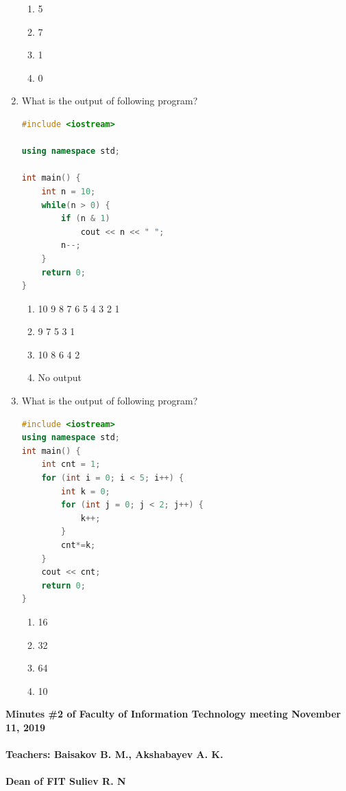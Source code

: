 \documentclass[10pt]{article}
\begin{document}
\begin{enumerate}
\begin{lstlisting}[language=C++]
\end{lstlisting}
\begin{enumerate}
    \item 5
    \item 7
    \item 1
    \item 0
\end{enumerate}




\item What is the output of following program?
\begin{lstlisting}[language=C++]
#include <iostream>
 
using namespace std;
 
int main() {
    int n = 10;
    while(n > 0) {
        if (n & 1)
            cout << n << " ";
        n--;
    }
    return 0;
}


\end{lstlisting}
\begin{enumerate}
    \item 10 9 8 7 6 5 4 3 2 1
    \item 9 7 5 3 1
    \item 10 8 6 4 2 
    \item No output
\end{enumerate}



\item What is the output of following program?
\begin{lstlisting}[language=C++]
#include <iostream>
using namespace std;
int main() {
    int cnt = 1;
    for (int i = 0; i < 5; i++) {
        int k = 0;
        for (int j = 0; j < 2; j++) {
            k++;
        }
        cnt*=k;
    }
    cout << cnt;
    return 0;
}
\end{lstlisting}
\begin{enumerate}
    \item 16
    \item 32
    \item 64 
    \item 10
\end{enumerate}


\end{enumerate}
\textbf{
Minutes \#2 of Faculty of Information Technology meeting November 11, 2019 \\\\
Teachers: Baisakov B. M., Akshabayev A. K. \\\\ 
Dean of FIT Suliev R. N \\\\
}
\end{document}
